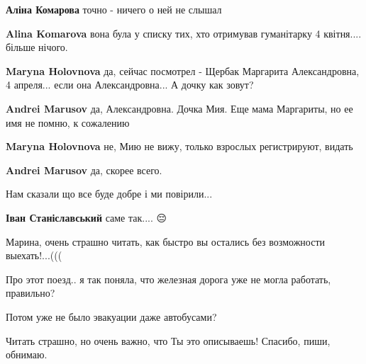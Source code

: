 \begin{itemize} %
\textbf{Аліна Комарова} точно - ничего о ней не слышал 🙁

\textbf{Alina Komarova} вона була у списку тих, хто отримував гуманітарку 4 квітня.... більше нічого.

\textbf{Maryna Holovnova} да, сейчас посмотрел - Щербак Маргарита Александровна, 4 апреля... если она Александровна... А дочку как зовут?

\textbf{Andrei Marusov} да, Александровна. Дочка Мия. Еще мама Маргариты, но ее имя не помню, к сожалению 🙁

\textbf{Maryna Holovnova} не, Мию не вижу, только взрослых регистрируют, видать

\textbf{Andrei Marusov} да, скорее всего.
\end{itemize} %



Нам сказали що все буде добре і ми повірили...

\begin{itemize} %
\textbf{Іван Станіславський} саме так.... 😔
\end{itemize} %


Марина, очень страшно читать, как быстро вы остались без возможности
выехать!...(((

Про этот поезд.. я так поняла, что железная дорога уже не могла работать,
правильно?

Потом уже не было эвакуации даже автобусами?

Читать страшно, но очень важно, что Ты это описываешь! Спасибо, пиши, обнимаю.

